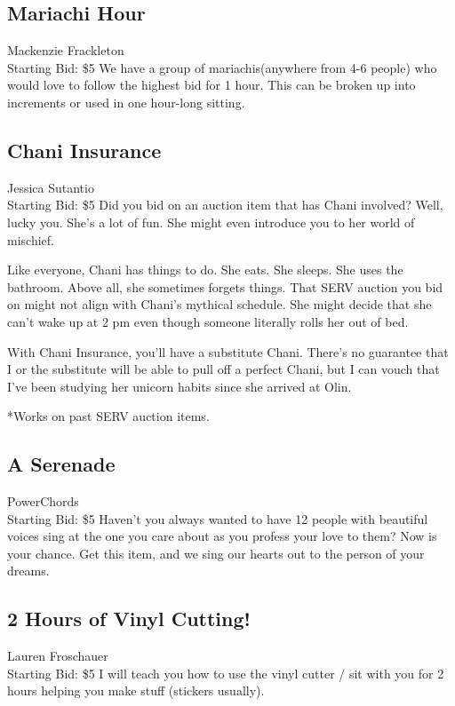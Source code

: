 \documentclass[11pt]{article}
\begin{document}
\subsection{Mariachi Hour}
Mackenzie Frackleton
\\
Starting Bid: \$5
\newline
We have a group of mariachis(anywhere from 4-6 people) who would love to follow the highest bid for 1 hour. This can be broken up into increments or used in one hour-long sitting.
\subsection{Chani Insurance}
Jessica Sutantio
\\
Starting Bid: \$5
\newline
Did you bid on an auction item that has Chani involved? Well, lucky you. She's a lot of fun. She might even introduce you to her world of mischief.

Like everyone, Chani has things to do. She eats. She sleeps. She uses the bathroom. Above all, she sometimes forgets things. That SERV auction you bid on might not align with Chani's mythical schedule. She might decide that she can't wake up at 2 pm even though someone literally rolls her out of bed.

With Chani Insurance, you'll have a substitute Chani. There's no guarantee that I or the substitute will be able to pull off a perfect Chani, but I can vouch that I've been studying her unicorn habits since she arrived at Olin.

*Works on past SERV auction items.
\subsection{A Serenade}
PowerChords
\\
Starting Bid: \$5
\newline
Haven't you always wanted to have 12 people with beautiful voices sing at the one you care about as you profess your love to them? Now is your chance. Get this item, and we sing our hearts out to the person of your dreams.
\subsection{2 Hours of Vinyl Cutting!}
Lauren Froschauer
\\
Starting Bid: \$5
\newline
I will teach you how to use the vinyl cutter / sit with you for 2 hours helping you make stuff (stickers usually).
\end{document}
